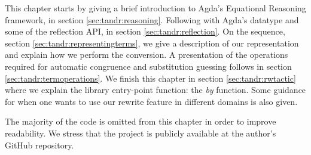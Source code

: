 This chapter starts by giving a brief introduction to Agda's Equational Reasoning framework, in section \ref{sec:tandr:reasoning}. Following with Agda's  datatype and some of the reflection API, in section \ref{sec:tandr:reflection}. 
On the sequence, section \ref{sec:tandr:representingterms}, we give a description of our  representation
and explain how we perform the conversion. A presentation of the operations required for 
automatic congruence and substitution guessing follows in section \ref{sec:tandr:termoperations}.
We finish this chapter in section \ref{sec:tandr:rwtactic} where we explain the library entry-point function: the \emph{by} function.
Some guidance for when one wants to use our rewrite feature in different domains is also given.

The majority of the code is omitted from this chapter in order to improve readability. We
stress that the project is publicly available at the author's GitHub repository.
